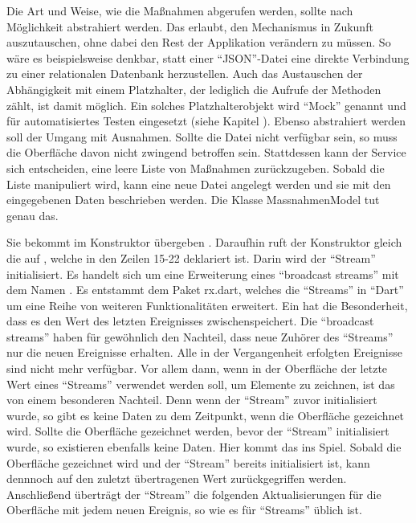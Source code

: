 Die Art und Weise, wie die Maßnahmen abgerufen werden, sollte nach Möglichkeit abstrahiert werden.
Das erlaubt, den Mechanismus in Zukunft auszutauschen, ohne dabei den Rest der Applikation verändern zu müssen.
So wäre es beispielsweise denkbar, statt einer \enquote{JSON}-Datei eine direkte Verbindung zu einer relationalen Datenbank herzustellen.
Auch das Austauschen der Abhängigkeit mit einem Platzhalter, der lediglich die Aufrufe der Methoden zählt, ist damit möglich.
Ein solches Platzhalterobjekt wird \enquote{Mock} genannt und für automatisiertes Testen eingesetzt (siehe Kapitel  ).
Ebenso abstrahiert werden soll der Umgang mit Ausnahmen.
Sollte die Datei nicht verfügbar sein, so muss die Oberfläche davon nicht zwingend betroffen sein.
Stattdessen kann der Service sich entscheiden, eine leere Liste von Maßnahmen zurückzugeben.
Sobald die Liste manipuliert wird, kann eine neue Datei angelegt werden und sie mit den eingegebenen Daten beschrieben werden.
Die Klasse MassnahmenModel \Lst{\ref{lst:Schritt1KlasseMassnahmenModel}} tut genau das.






Sie bekommt  im Konstruktor übergeben .
Daraufhin ruft der Konstruktor gleich die  auf , welche in den Zeilen 15-22 deklariert ist.
Darin wird der \enquote{Stream}   initialisiert.
Es handelt sich um eine Erweiterung eines \enquote{broadcast streams} mit dem Namen  .
Es entstammt dem Paket rx.dart, welches die \enquote{Streams} in \enquote{Dart} um eine Reihe von weiteren Funktionalitäten erweitert.
Ein  hat die Besonderheit, dass es den Wert des letzten Ereignisses zwischenspeichert.
Die \enquote{broadcast streams} haben für gewöhnlich den Nachteil, dass neue Zuhörer des \enquote{Streams} nur die neuen Ereignisse erhalten.
Alle in der Vergangenheit erfolgten Ereignisse sind nicht mehr verfügbar.
Vor allem dann, wenn in der Oberfläche der letzte Wert eines \enquote{Streams} verwendet werden soll, um Elemente zu zeichnen, ist das von einem besonderen Nachteil.
Denn wenn der \enquote{Stream} zuvor initialisiert wurde, so gibt es keine Daten zu dem Zeitpunkt, wenn die Oberfläche gezeichnet wird.
Sollte die Oberfläche gezeichnet werden, bevor der \enquote{Stream} initialisiert wurde, so  existieren ebenfalls keine Daten.
Hier kommt das  ins Spiel.
Sobald die Oberfläche gezeichnet wird und der \enquote{Stream} bereits initialisiert ist, kann dennnoch auf den zuletzt übertragenen Wert zurückgegriffen werden.
Anschließend überträgt der \enquote{Stream} die folgenden Aktualisierungen für die Oberfläche mit jedem neuen Ereignis, so wie es für \enquote{Streams} üblich ist.

